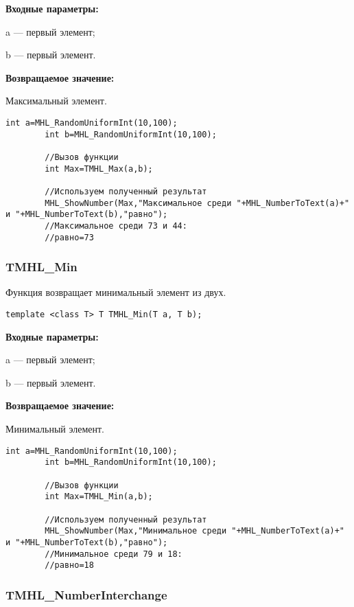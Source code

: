 \documentclass[a4paper,12pt]{article}
\begin{document}
\textbf{Входные параметры:}

 a --- первый элемент;
	
 b --- первый элемент.


\textbf{Возвращаемое значение:}

Максимальный элемент.


\begin{lstlisting}[label=code_use_TMHL_Max,caption=Пример использования]
        int a=MHL_RandomUniformInt(10,100);
        int b=MHL_RandomUniformInt(10,100);

        //Вызов функции
        int Max=TMHL_Max(a,b);

        //Используем полученный результат
        MHL_ShowNumber(Max,"Максимальное среди "+MHL_NumberToText(a)+" и "+MHL_NumberToText(b),"равно");
        //Максимальное среди 73 и 44:
        //равно=73
\end{lstlisting}

\subsubsection{TMHL\_Min}\label{TMHL_Min}

Функция возвращает минимальный элемент из двух.


\begin{lstlisting}[label=code_syntax_TMHL_Min,caption=Синтаксис]
template <class T> T TMHL_Min(T a, T b);
\end{lstlisting}

\textbf{Входные параметры:}

 a --- первый элемент;
	
 b --- первый элемент.

\textbf{Возвращаемое значение:}

Минимальный элемент.


\begin{lstlisting}[label=code_use_TMHL_Min,caption=Пример использования]
        int a=MHL_RandomUniformInt(10,100);
        int b=MHL_RandomUniformInt(10,100);

        //Вызов функции
        int Max=TMHL_Min(a,b);

        //Используем полученный результат
        MHL_ShowNumber(Max,"Минимальное среди "+MHL_NumberToText(a)+" и "+MHL_NumberToText(b),"равно");
        //Минимальное среди 79 и 18:
        //равно=18
\end{lstlisting}

\subsubsection{TMHL\_NumberInterchange}\label{TMHL_NumberInterchange}
\end{document}
